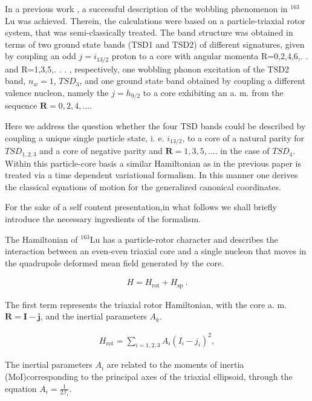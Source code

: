 \documentclass[twocolumn,article,amsmath,amssymb,floatfix,aps]{revtex4}
\begin{document}
In  a previous work \cite{raduta2020towards,raduta2020new}, a successful  description of the wobbling phenomenon in $^{163}$Lu was achieved.  Therein, the calculations were based on a particle-triaxial rotor system, that was semi-classically treated. 
The band structure was obtained in terms of two ground state bands (TSD1 and TSD2) of different signatures, given by  coupling  an odd $j=i_{13/2}$ proton to a core with angular momenta R=0,2,4,6,. .  and R=1,3,5,. . . , respectively, one wobbling phonon excitation  of the TSD2 band, $n_w=1$, $TSD_3$, and one ground state band obtained by coupling  a different valence nucleon, namely the $j=h_{9/2}$ to a core exhibiting an a. m.  from the sequence $\mathbf{R}=0,2,4,\dots$.  

Here we address the question whether the four TSD bands could be described by coupling a unique single particle state, i. e.  $i_{13/2}$, to a core of a natural parity for $TSD_{1,2,3}$ and a core of negative parity and $\mathbf{R}=1,3,5,\dots$.  in the case of $TSD_4$.  Within this particle-core basis a similar Hamiltonian as in the previous paper is treated via a time dependent variational formalism.  In this manner one derives the classical equations of motion for the generalized canonical coordinates. 

For the sake of a self content presentation,in what follows we shall briefly introduce the necessary ingredients of the formalism.  

The Hamiltonian of $^{163}$Lu has a particle-rotor character and describes the interaction between an even-even triaxial core and a single nucleon that moves in the quadrupole deformed mean field generated by the core. 

\begin{align}
    H=H_\text{rot}+H_\text{sp}\ .  \label{hamiltonian_formula}
\end{align}

The first term represents the triaxial rotor Hamiltonian, with the core a. m.  $\mathbf{R}=\mathbf{I}-\mathbf{j}$, and the inertial parameters $A_k$. 

\begin{align}
    H_\text{rot}=\sum_{i=1,2,3}A_i\left(I_i-j_i\right)^2,
\end{align}
 
 The inertial parameters $A_i$ are related to the moments of inertia (MoI)corresponding to the principal axes of the triaxial ellipsoid, through the equation $A_i=\frac{1}{2\mathcal{I}_i}$.  
\end{document}
